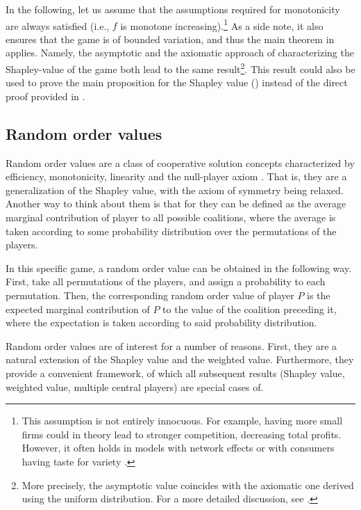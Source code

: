 \documentclass[a4paper]{article}
\begin{document}
In the following, let us assume that the assumptions required for monotonicity are always satisfied (i.e., $f$ is monotone increasing).\footnote{
    This assumption is not entirely innocuous.
    For example, having more small firms could in theory lead to stronger competition, decreasing total profits.
    However, it often holds in models with network effects \parencite{rochet2003platform} or with consumers having taste for variety \parencite{anderson2020aggregative}.
}
As a side note, it also ensures that the game is of bounded variation, and thus the main theorem in \textcite{fogelman1980asymptotic} applies.
Namely, the asymptotic and the axiomatic approach of characterizing the Shapley-value of the game both lead to the same result\footnote{
    More precisely, the asymptotic value coincides with the axiomatic one derived using the uniform distribution.
    For a more detailed discussion, see \textcite{fogelman1980asymptotic}.
}.
This result could also be used to prove the main proposition for the Shapley value () instead of the direct proof provided in .

\subsection{Random order values}

Random order values are a class of cooperative solution concepts characterized by efficiency, monotonicity, linearity and the null-player axiom \parencite{weber1988probabilistic}.
That is, they are a generalization of the Shapley value, with the axiom of symmetry being relaxed.
Another way to think about them is that for they can be defined as the average marginal contribution of player to all possible coalitions, where the average is taken according to some probability distribution over the permutations of the players.

In this specific game, a random order value can be obtained in the following way.
First, take all permutations of the players, and assign a probability to each permutation.
Then, the corresponding random order value of player $P$ is the expected marginal contribution of $P$ to the value of the coalition preceding it, where the expectation is taken according to said probability distribution.

Random order values are of interest for a number of reasons.
First, they are a natural extension of the Shapley value and the weighted value.
Furthermore, they provide a convenient framework, of which all subsequent results (Shapley value, weighted value, multiple central players) are special cases of.
\end{document}
